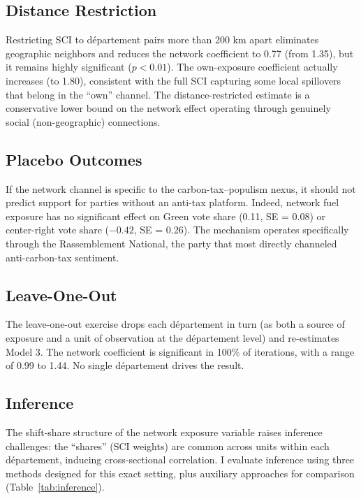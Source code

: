 \documentclass[12pt]{article}
\newcommand{\rn}{Rassemblement National}
\newcommand{\dept}{d\'{e}partement}
\begin{document}
\subsection{Distance Restriction}

Restricting SCI to \dept{} pairs more than 200 km apart eliminates geographic neighbors and reduces the network coefficient to 0.77 (from 1.35), but it remains highly significant ($p < 0.01$). The own-exposure coefficient actually increases (to 1.80), consistent with the full SCI capturing some local spillovers that belong in the ``own'' channel. The distance-restricted estimate is a conservative lower bound on the network effect operating through genuinely social (non-geographic) connections.

\subsection{Placebo Outcomes}

If the network channel is specific to the carbon-tax--populism nexus, it should not predict support for parties without an anti-tax platform. Indeed, network fuel exposure has no significant effect on Green vote share (0.11, SE = 0.08) or center-right vote share ($-0.42$, SE = 0.26). The mechanism operates specifically through the \rn{}, the party that most directly channeled anti-carbon-tax sentiment.

\subsection{Leave-One-Out}

The leave-one-out exercise drops each \dept{} in turn (as both a source of exposure and a unit of observation at the \dept{} level) and re-estimates Model 3. The network coefficient is significant in 100\% of iterations, with a range of 0.99 to 1.44. No single \dept{} drives the result.

\subsection{Inference}
\label{sec:inference}

The shift-share structure of the network exposure variable raises inference challenges: the ``shares'' (SCI weights) are common across units within each \dept{}, inducing cross-sectional correlation. I evaluate inference using three methods designed for this exact setting, plus auxiliary approaches for comparison (Table~\ref{tab:inference}).
\end{document}
